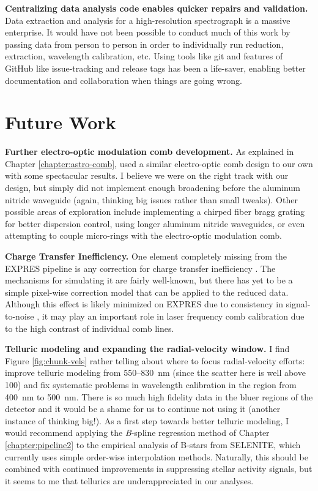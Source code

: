 \textbf{Centralizing data analysis code enables quicker repairs and validation.} Data extraction and analysis for a high-resolution spectrograph is a massive enterprise. It would have not been possible to conduct much of this work by passing data from person to person in order to individually run reduction, extraction, wavelength calibration, etc. Using tools like git and features of GitHub like issue-tracking and release tags has been a life-saver, enabling better documentation and collaboration when things are going wrong.

\section{Future Work} \label{conclusion:future}

\textbf{Further electro-optic modulation comb development.} As explained in Chapter \ref{chapter:astro-comb}, \citet{obrzud_visible_2019} used a similar electro-optic comb design to our own with some spectacular results. I believe we were on the right track with our design, but simply did not implement enough broadening before the aluminum nitride waveguide (again, thinking big issues rather than small tweaks). Other possible areas of exploration include implementing a chirped fiber bragg grating for better dispersion control, using longer aluminum nitride waveguides, or even attempting to couple micro-rings with the electro-optic modulation comb.

\textbf{Charge Transfer Inefficiency.} One element completely missing from the EXPRES pipeline is any correction for charge transfer inefficiency \citep{goudfrooij_empirical_2006, bouchy_charge_2009, blake_impact_2017}. The mechanisms for simulating it are fairly well-known, but there has yet to be a simple pixel-wise correction model that can be applied to the reduced data. Although this effect is likely minimized on EXPRES due to consistency in signal-to-noise \citep{blackman_performance_2020}, it may play an important role in laser frequency comb calibration due to the high contrast of individual comb lines.

\textbf{Telluric modeling and expanding the radial-velocity window.} I find Figure \ref{fig:chunk-vels} rather telling about where to focus radial-velocity efforts: improve telluric modeling from 550--830~\si{\nano\meter} (since the scatter here is well above 100\ms) and fix systematic problems in wavelength calibration in the region from 400~\si{\nano\meter} to 500~\si{\nano\meter}. There is so much high fidelity data in the bluer regions of the detector and it would be a shame for us to continue not using it (another instance of thinking big!). As a first step towards better telluric modeling, I would recommend applying the \textit{B}-spline regression method of Chapter \ref{chapter:pipeline2} to the empirical analysis of B-stars from SELENITE, which currently uses simple order-wise interpolation methods. Naturally, this should be combined with continued improvements in suppressing stellar activity signals, but it seems to me that tellurics are underappreciated in our analyses.

